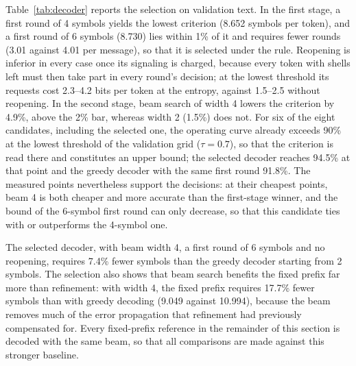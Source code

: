 Table~\ref{tab:decoder} reports the selection on validation text. In the first stage, a first round of 4 symbols yields the lowest criterion (8.652 symbols per token), and a first round of 6 symbols (8.730) lies within 1\% of it and requires fewer rounds (3.01 against 4.01 per message), so that it is selected under the rule. Reopening is inferior in every case once its signaling is charged, because every token with shells left must then take part in every round's decision; at the lowest threshold its requests cost 2.3--4.2 bits per token at the entropy, against 1.5--2.5 without reopening. In the second stage, beam search of width 4 lowers the criterion by 4.9\%, above the 2\% bar, whereas width 2 (1.5\%) does not. For six of the eight candidates, including the selected one, the operating curve already exceeds 90\% at the lowest threshold of the validation grid ($\tau = 0.7$), so that the criterion is read there and constitutes an upper bound; the selected decoder reaches 94.5\% at that point and the greedy decoder with the same first round 91.8\%. The measured points nevertheless support the decisions: at their cheapest points, beam 4 is both cheaper and more accurate than the first-stage winner, and the bound of the 6-symbol first round can only decrease, so that this candidate ties with or outperforms the 4-symbol one.

The selected decoder, with beam width 4, a first round of 6 symbols and no reopening, requires 7.4\% fewer symbols than the greedy decoder starting from 2 symbols. The selection also shows that beam search benefits the fixed prefix far more than refinement: with width 4, the fixed prefix requires 17.7\% fewer symbols than with greedy decoding (9.049 against 10.994), because the beam removes much of the error propagation that refinement had previously compensated for. Every fixed-prefix reference in the remainder of this section is decoded with the same beam, so that all comparisons are made against this stronger baseline.

